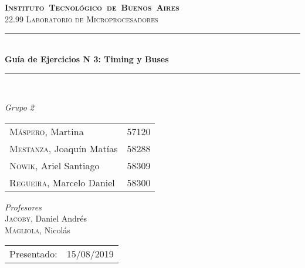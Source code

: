 \begin{titlepage}
\newcommand{\HRule}{\rule{\linewidth}{0.5mm}}
\center
\mbox{\textsc{\LARGE \bfseries {Instituto Tecnol\'ogico de Buenos Aires}}}\\[1.5cm]
\textsc{\Large 22.99 Laboratorio de Microprocesadores}\\[0.5cm]


\HRule \\[0.6cm]
{ \Huge \bfseries Guía de Ejercicios N 3: Timing y Buses}\\[0.4cm] %
\HRule \\[1.5cm]


{\large

\emph{Grupo 2}\\
\vspace{3px}

\begin{tabular}{lr} 	
\textsc{M\'aspero}, Martina  & 57120 \\
\textsc{Mestanza}, Joaqu\'in Mat\'ias  & 58288 \\
\textsc{Nowik}, Ariel Santiago  & 58309 \\
\textsc{Regueira}, Marcelo Daniel  & 58300 \\
\end{tabular}

\vspace{20px}

\emph{Profesores}\\
\vspace{3px}
\textsc{Jacoby}, Daniel Andr\'es\\ 	
\textsc{Magliola}, Nicol\'as\\ 	

\vspace{100px}

\begin{tabular}{ll}

Presentado: & 15/08/2019\\

\end{tabular}

}

\vfill

\end{titlepage}
